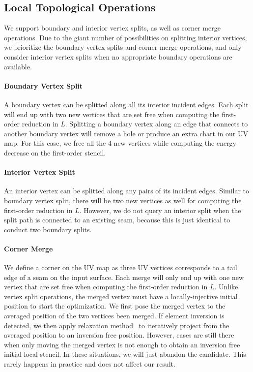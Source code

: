 \subsection{Local Topological Operations}

We support boundary and interior vertex splits, as well as corner merge operations.  Due to the giant number of possibilities on splitting interior vertices, we prioritize the boundary vertex splits and corner merge operations, and only consider interior vertex splits when no appropriate boundary operations are available.

\paragraph{Boundary Vertex Split}
A boundary vertex can be splitted along all its interior incident edges. Each split will end up with two new vertices that are set free when computing the first-order reduction in $L$.
Splitting a boundary vertex along an edge that connects to another boundary vertex will remove a hole or produce an extra chart in our UV map. For this case, we free all the 4 new vertices while computing the energy decrease on the first-order stencil. 

\paragraph{Interior Vertex Split}
An interior vertex can be splitted along any pairs of its incident edges. Similar to boundary vertex split, there will be two new vertices as well for computing the first-order reduction in $L$.
However, we do not query an interior split when the split path is connected to an existing seam, because this is just identical to conduct two boundary splits.

\paragraph{Corner Merge}
We define a corner on the UV map as three UV vertices corresponds to a tail edge of a seam on the input surface. Each merge will only end up with one new vertex that are set free when computing the first-order reduction in $L$.
Unlike vertex split operations, the merged vertex must have a locally-injective initial position to start the optimization. We first pose the merged vertex to the averaged position of the two vertices been merged. If element inversion is detected, we then apply relaxation method~\cite{Agmon1954Relaxation} to iteratively project from the averaged position to an inversion free position. However, cases are still there when only moving the merged vertex is not enough to obtain an inversion free initial local stencil. In these situations, we will just abandon the candidate. This rarely happens in practice and does not affect our result.


